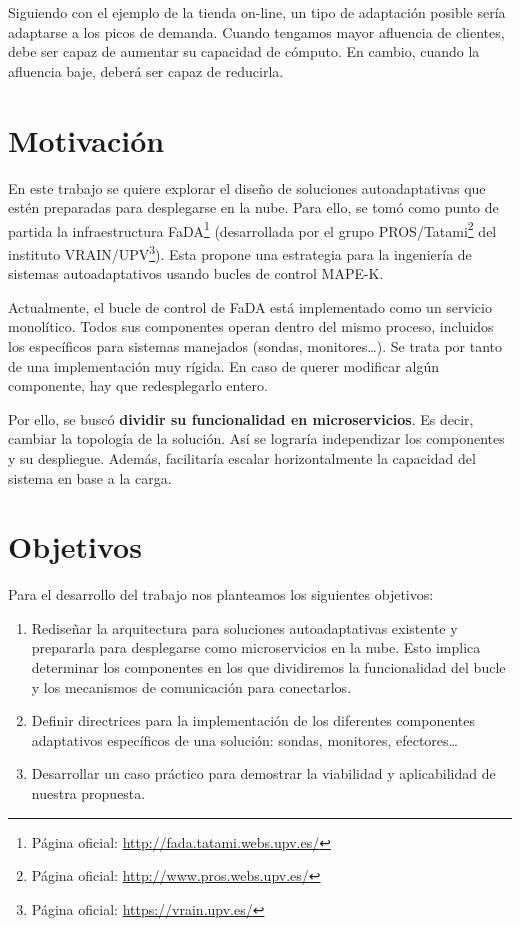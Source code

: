 Siguiendo con el ejemplo de la tienda on-line, un tipo de adaptación posible sería adaptarse a los picos de demanda. Cuando tengamos mayor afluencia de clientes, debe ser capaz de aumentar su capacidad de cómputo. En cambio, cuando la afluencia baje, deberá ser capaz de reducirla.

\section{Motivación}

En este trabajo se quiere explorar el diseño de soluciones autoadaptativas que estén preparadas para desplegarse en la nube. Para ello, se tomó como punto de partida la infraestructura FaDA\footnote{Página oficial: \url{http://fada.tatami.webs.upv.es/}} (desarrollada por el grupo PROS/Tatami\footnote{Página oficial: \url{http://www.pros.webs.upv.es/}} del instituto VRAIN/UPV\footnote{Página oficial: \url{https://vrain.upv.es/}}). Esta propone una estrategia para la ingeniería de sistemas autoadaptativos usando bucles de control MAPE-K\cite{ibmArchitecturalBlueprintAutonomic2006, fonsServiciosAdaptivereadyPara2021}.

Actualmente, el bucle de control de FaDA está implementado como un servicio monolítico. Todos sus componentes operan dentro del mismo proceso, incluidos los específicos para sistemas manejados (sondas, monitores\dots). Se trata por tanto de una implementación muy rígida. En caso de querer modificar algún componente, hay que redesplegarlo entero.

Por ello, se buscó \textbf{dividir su funcionalidad en microservicios}. Es decir, cambiar la topología de la solución. Así se lograría independizar los componentes y su despliegue. Además, facilitaría escalar horizontalmente la capacidad del sistema en base a la carga.

\section{Objetivos}

Para el desarrollo del trabajo nos planteamos los siguientes objetivos:

\begin{enumerate}
  \item Rediseñar la arquitectura para soluciones autoadaptativas existente y prepararla para desplegarse como microservicios en la nube. Esto implica determinar los componentes en los que dividiremos la funcionalidad del bucle y los mecanismos de comunicación para conectarlos.

  \item Definir directrices para la implementación de los diferentes componentes adaptativos específicos de una solución: sondas, monitores, efectores\dots

  \item Desarrollar un caso práctico para demostrar la viabilidad y aplicabilidad de nuestra propuesta.
\end{enumerate}

